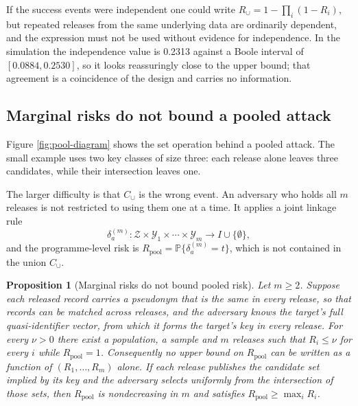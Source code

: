 \documentclass[11pt,a4paper]{article}
\theoremstyle{plain}
\newtheorem{proposition}{Proposition}
\theoremstyle{definition}
\theoremstyle{definition}
\theoremstyle{plain}
\newcommand{\Prob}{\mathbb{P}}
\begin{document}
If the success events were independent one could write $R_\cup = 1 -
\prod_{i}(1 - R_i)$, but repeated releases from the same underlying data are
ordinarily dependent, and the expression must not be used without evidence for
independence. In the simulation the independence value is 0.2313 against
a Boole interval of $[0.0884, 0.2530]$, so it looks reassuringly close to the upper
bound; that agreement is a coincidence of the design and carries no
information.

\subsection{Marginal risks do not bound a pooled attack}

Figure \ref{fig:pool-diagram} shows the set operation behind a pooled attack.
The small example uses two key classes of size three: each release alone
leaves three candidates, while their intersection leaves one.


The larger difficulty is that $C_\cup$ is the wrong event. An adversary who holds
all $m$ releases is not restricted to using them one at a time. It applies a
joint linkage rule
\begin{equation}
\delta_a^{(m)} : \mathcal{Z} \times \mathcal{Y}_1 \times \cdots \times
\mathcal{Y}_m \longrightarrow I \cup \{\emptyset\} ,
\label{eq:joint}
\end{equation}
and the programme-level risk is $R_{\mathrm{pool}} = \Prob\{\delta_a^{(m)} =
t\}$, which is not contained in the union $C_\cup$.

\begin{proposition}[Marginal risks do not bound pooled risk]\label{prop:nopool}
Let $m \geq 2$. Suppose each released record carries a pseudonym that is the same
in every release, so that records can be matched across releases, and the adversary
knows the target's full quasi-identifier vector, from which it forms the target's key
in every release. For every $\nu > 0$ there exist a population, a sample and $m$
releases such that $R_i \leq \nu$ for every $i$ while
$R_{\mathrm{pool}} = 1$. Consequently no upper bound on $R_{\mathrm{pool}}$ can
be written as a function of $(R_1, \dots, R_m)$ alone. If each release
publishes the candidate set implied by its key and the adversary selects
uniformly from the intersection of those sets, then $R_{\mathrm{pool}}$ is
nondecreasing in $m$ and satisfies $R_{\mathrm{pool}} \geq \max_i R_i$.
\end{proposition}
\end{document}
